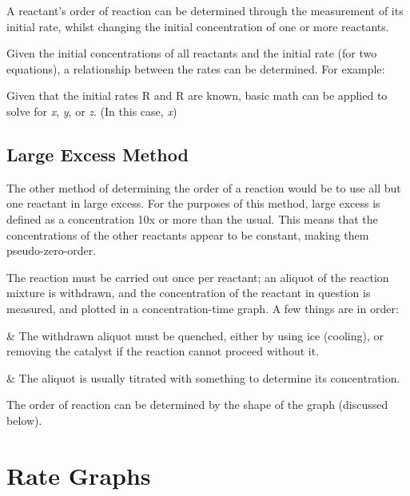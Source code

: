 			A reactant’s order of reaction can be determined through the measurement of its initial rate, whilst changing the initial
			concentration of one or more reactants.

			Given the initial concentrations of all reactants and the initial rate (for two equations), a relationship between the rates can be
			determined. For example:


			Given that the initial rates R and R are known, basic math can be applied to solve for \textit{x}, \textit{y},
			or \textit{z}. (In this case, \textit{x})


		\subsection{Large Excess Method}

			The other method of determining the order of a reaction would be to use all but one reactant in large excess. For the purposes of this
			method, large excess is defined as a concentration 10x or more than the usual. This means that the concentrations of the other
			reactants appear to be constant, making them pseudo-zero-order.

			The reaction must be carried out once per reactant; an aliquot of the reaction mixture is withdrawn, and the concentration of the
			reactant in question is measured, and plotted in a concentration-time graph. A few things are in order:

			\begin{bulletlist}
				&	The withdrawn aliquot must be quenched, either by using ice (cooling), or removing the catalyst if the reaction cannot proceed
					without it.

				&	The aliquot is usually titrated with something to determine its concentration.
			\end{bulletlist}

			The order of reaction can be determined by the shape of the graph (discussed below).







	\pagebreak
	\section{Rate Graphs}

